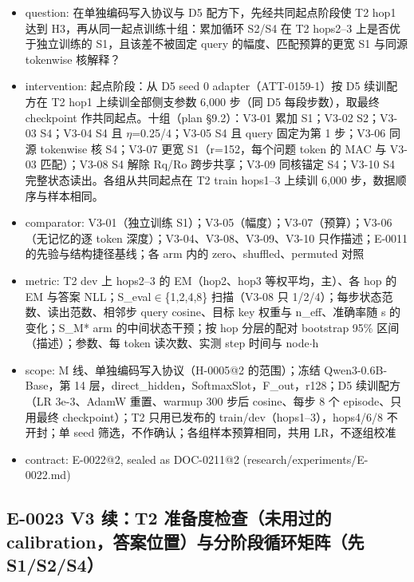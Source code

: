 \documentclass[11pt]{article}
\begin{document}
\begin{itemize}
\item question: 在单独编码写入协议与 D5 配方下，先经共同起点阶段使 T2 hop1 达到 H3，再从同一起点训练十组：累加循环 S2/S4 在 T2 hops2--3 上是否优于独立训练的 S1，且该差不被固定 query 的幅度、匹配预算的更宽 S1 与同源 tokenwise 核解释？
\item intervention: 起点阶段：从 D5 seed 0 adapter（ATT-0159-1）按 D5 续训配方在 T2 hop1 上续训全部侧支参数 6,000 步（同 D5 每段步数），取最终 checkpoint 作共同起点。十组（plan §9.2）：V3-01 累加 S1；V3-02 S2；V3-03 S4；V3-04 S4 且 \ensuremath{\eta}=0.25/4；V3-05 S4 且 query 固定为第 1 步；V3-06 同源 tokenwise 核 S4；V3-07 更宽 S1（r=152，每个问题 token 的 MAC 与 V3-03 匹配）；V3-08 S4 解除 Rq/Ro 跨步共享；V3-09 同核锚定 S4；V3-10 S4 完整状态读出。各组从共同起点在 T2 train hops1--3 上续训 6,000 步，数据顺序与样本相同。
\item comparator: V3-01（独立训练 S1）；V3-05（幅度）；V3-07（预算）；V3-06（无记忆的逐 token 深度）；V3-04、V3-08、V3-09、V3-10 只作描述；E-0011 的先验与结构捷径基线；各 arm 内的 zero、shuffled、permuted 对照
\item metric: T2 dev 上 hops2--3 的 EM（hop2、hop3 等权平均，主）、各 hop 的 EM 与答案 NLL；S\_eval\ensuremath{\in}\{1,2,4,8\} 扫描（V3-08 只 1/2/4）；每步状态范数、读出范数、相邻步 query cosine、目标 key 权重与 n\_eff、准确率随 s 的变化；S\_M* arm 的中间状态干预；按 hop 分层的配对 bootstrap 95\% 区间（描述）；参数、每 token 读次数、实测 step 时间与 node\ensuremath{\cdot}h
\item scope: M 线、单独编码写入协议（H-0005@2 的范围）；冻结 Qwen3-0.6B-Base，第 14 层，direct\_hidden，SoftmaxSlot，F\_out，r128；D5 续训配方（LR 3e-3、AdamW 重置、warmup 300 步后 cosine、每步 8 个 episode、只用最终 checkpoint）；T2 只用已发布的 train/dev（hops1--3），hops4/6/8 不开封；单 seed 筛选，不作确认；各组样本预算相同，共用 LR，不逐组校准
\item contract: E-0022@2, sealed as DOC-0211@2 (research/experiments/E-0022.md)
\end{itemize}

\subsection*{E-0023 V3 续：T2 准备度检查（未用过的 calibration，答案位置）与分阶段循环矩阵（先 S1/S2/S4）}
\end{document}

